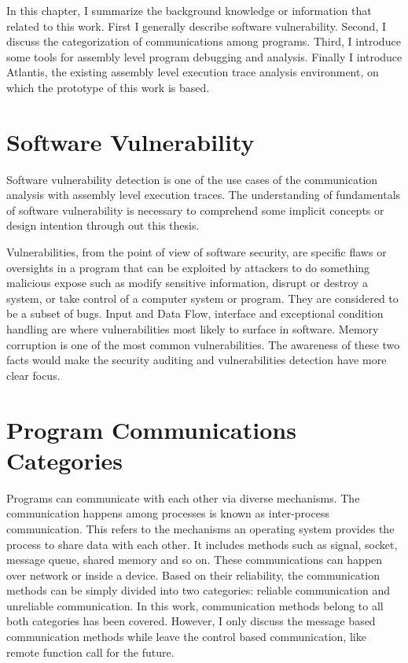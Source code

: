 \label{chapter:Bac}
In this chapter, I summarize the background knowledge or information that related to this work. First I generally describe software vulnerability. Second, I discuss the categorization of communications among programs. Third, I introduce some tools for assembly level program debugging and analysis. Finally I introduce Atlantis, the existing assembly level execution trace analysis environment, on which the prototype of this work is based.

\section{Software Vulnerability}
Software vulnerability detection is one of the use cases of the communication analysis with assembly level execution traces. The understanding of fundamentals of software vulnerability is necessary to comprehend some implicit concepts or design intention through out this thesis. 

Vulnerabilities, from the point of view of software security, are specific flaws or oversights in a program that can be exploited by attackers to do something malicious expose such as modify sensitive information, disrupt or destroy a system, or take control of a computer system or program. They are considered to be a subset of bugs. Input and Data Flow, interface and exceptional condition handling are where vulnerabilities most likely to surface in software. Memory corruption is one of the most common vulnerabilities. The awareness of these two facts would make the security auditing and vulnerabilities detection have more clear focus. \cite{dowd_art_2006}

\section{Program Communications Categories}
Programs can communicate with each other via diverse mechanisms. The communication happens among processes is known as inter-process communication. This refers to the mechanisms an operating system provides the process to share data with each other. It includes methods such as signal, socket, message queue, shared memory and so on.\cite{garrido2000inter} These communications can happen over network or inside a device. Based on their reliability, the communication methods can be simply divided into two categories: reliable communication and unreliable communication. In this work, communication methods belong to all both categories has been covered. However, I only discuss the message based communication methods while leave the control based communication, like remote function call for the future.

